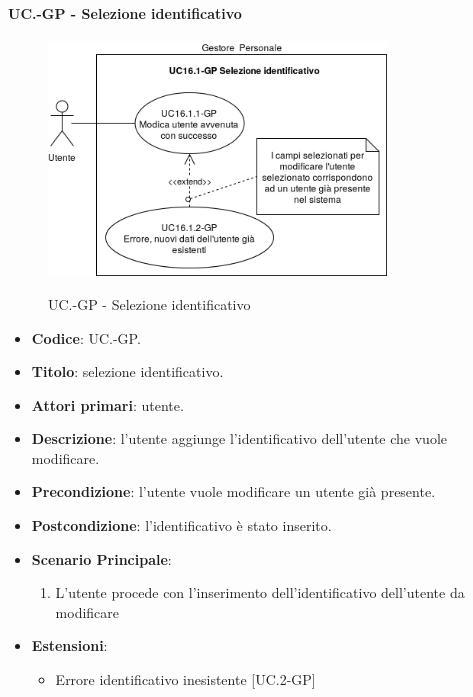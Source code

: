 	\paragraph{UC\theuccount.\thesubuccount-GP - Selezione identificativo}
		\begin{figure}[H]
			\centering
			\includegraphics[width=0.8\textwidth]{img/casi_d'uso/UC16_1.png}\\
			\caption{UC\theuccount.\thesubuccount-GP - Selezione identificativo}
		\end{figure}
		\begin{itemize}
			\item \textbf{Codice}: UC\theuccount.\thesubuccount-GP.
			\item \textbf{Titolo}: selezione identificativo.
			\item \textbf{Attori primari}: utente.
			\item \textbf{Descrizione}: l'utente aggiunge l'identificativo dell'utente che vuole modificare.
			\item \textbf{Precondizione}: l'utente vuole modificare un utente già presente.
			\item \textbf{Postcondizione}: l'identificativo è stato inserito.
			\item \textbf{Scenario Principale}:
			\begin{enumerate}
				\item L'utente procede con l'inserimento dell'identificativo dell'utente da modificare
			\end{enumerate}
			\item \textbf{Estensioni}:
			\begin{itemize}
				\item Errore identificativo inesistente [UC\theuccount.2-GP]
			\end{itemize}
		\end{itemize}
		
